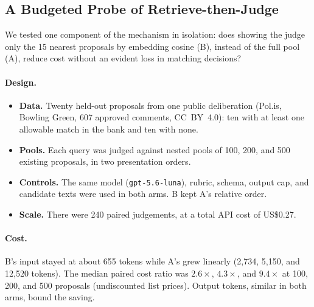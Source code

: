 \subsection{A Budgeted Probe of Retrieve-then-Judge}\label{sec:scaleprobe}

We tested one component of the mechanism in isolation: does showing the judge
only the 15 nearest proposals by embedding cosine (B), instead of the full pool
(A), reduce cost without an evident loss in matching decisions?

\paragraph{Design.}
\begin{itemize}
  \item \textbf{Data.} Twenty held-out proposals from one public deliberation
    (Pol.is, Bowling Green, 607 approved comments, CC~BY~4.0): ten with at least
    one allowable match in the bank and ten with none.
  \item \textbf{Pools.} Each query was judged against nested pools of 100, 200,
    and 500 existing proposals, in two presentation orders.
  \item \textbf{Controls.} The same model (\texttt{gpt-5.6-luna}), rubric,
    schema, output cap, and candidate texts were used in both arms. B kept A's
    relative order.
  \item \textbf{Scale.} There were 240 paired judgements, at a total API cost of
    US\$0.27.
\end{itemize}

\paragraph{Cost.} B's input stayed at about 655 tokens while A's grew linearly
(2,734, 5,150, and 12,520 tokens). The median paired cost ratio was
$2.6\times$, $4.3\times$, and $9.4\times$ at 100, 200, and 500 proposals
(undiscounted list prices). Output tokens, similar in both arms, bound the saving.

